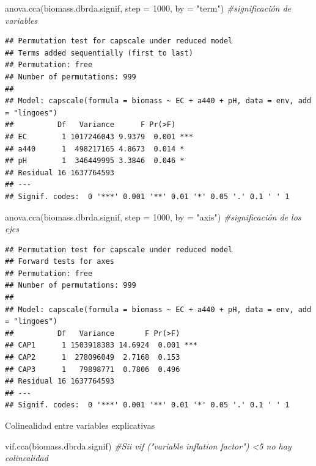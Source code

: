 \documentclass[
]{book}
\newenvironment{Shaded}{\begin{snugshade}}{\end{snugshade}}
\newcommand{\AttributeTok}[1]{\textcolor[rgb]{0.77,0.63,0.00}{#1}}
\newcommand{\CommentTok}[1]{\textcolor[rgb]{0.56,0.35,0.01}{\textit{#1}}}
\newcommand{\DecValTok}[1]{\textcolor[rgb]{0.00,0.00,0.81}{#1}}
\newcommand{\FunctionTok}[1]{\textcolor[rgb]{0.00,0.00,0.00}{#1}}
\newcommand{\NormalTok}[1]{#1}
\newcommand{\StringTok}[1]{\textcolor[rgb]{0.31,0.60,0.02}{#1}}
\begin{document}
\begin{Shaded}
\begin{Highlighting}[]
\FunctionTok{anova.cca}\NormalTok{(biomass.dbrda.signif, }\AttributeTok{step =} \DecValTok{1000}\NormalTok{, }\AttributeTok{by =} \StringTok{"term"}\NormalTok{) }\CommentTok{\#significación de variables }
\end{Highlighting}
\end{Shaded}

\begin{verbatim}
## Permutation test for capscale under reduced model
## Terms added sequentially (first to last)
## Permutation: free
## Number of permutations: 999
## 
## Model: capscale(formula = biomass ~ EC + a440 + pH, data = env, add = "lingoes")
##          Df   Variance      F Pr(>F)    
## EC        1 1017246043 9.9379  0.001 ***
## a440      1  498217165 4.8673  0.014 *  
## pH        1  346449995 3.3846  0.046 *  
## Residual 16 1637764593                  
## ---
## Signif. codes:  0 '***' 0.001 '**' 0.01 '*' 0.05 '.' 0.1 ' ' 1
\end{verbatim}

\begin{Shaded}
\begin{Highlighting}[]
\FunctionTok{anova.cca}\NormalTok{(biomass.dbrda.signif, }\AttributeTok{step =} \DecValTok{1000}\NormalTok{, }\AttributeTok{by =} \StringTok{"axis"}\NormalTok{) }\CommentTok{\#significación de los ejes}
\end{Highlighting}
\end{Shaded}

\begin{verbatim}
## Permutation test for capscale under reduced model
## Forward tests for axes
## Permutation: free
## Number of permutations: 999
## 
## Model: capscale(formula = biomass ~ EC + a440 + pH, data = env, add = "lingoes")
##          Df   Variance       F Pr(>F)    
## CAP1      1 1503918383 14.6924  0.001 ***
## CAP2      1  278096049  2.7168  0.153    
## CAP3      1   79898771  0.7806  0.496    
## Residual 16 1637764593                   
## ---
## Signif. codes:  0 '***' 0.001 '**' 0.01 '*' 0.05 '.' 0.1 ' ' 1
\end{verbatim}

Colinealidad entre variables explicativas

\begin{Shaded}
\begin{Highlighting}[]
\FunctionTok{vif.cca}\NormalTok{(biomass.dbrda.signif) }\CommentTok{\#Sii vif ("variable inflation factor") \textless{}5 no hay colinealidad}
\end{Highlighting}
\end{Shaded}
\end{document}
